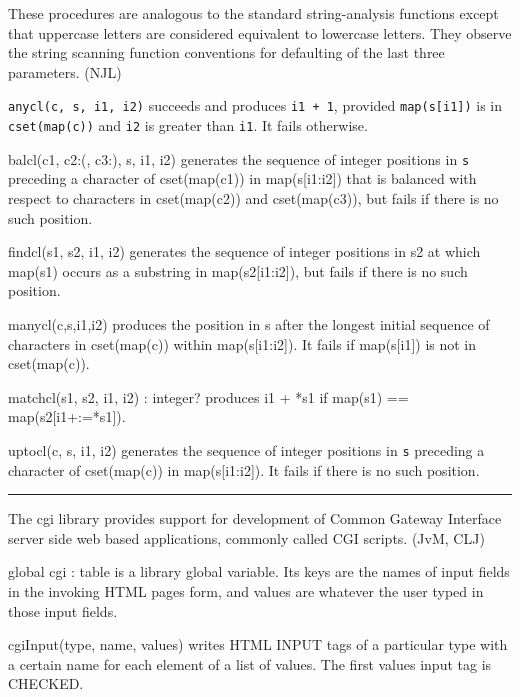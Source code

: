 These procedures are analogous to the standard string-analysis functions
except that uppercase letters are considered equivalent to lowercase
letters. They observe the string scanning function conventions for
defaulting of the last three parameters. (NJL)

\texttt{anycl(c, s, i1, i2)} succeeds and produces \texttt{i1 + 1},
provided \texttt{map(s[i1])} is in \texttt{cset(map(c))} and
\texttt{i2} is greater than \texttt{i1}. It fails otherwise.

\textsf{balcl(c1, c2:{\textquotesingle}({\textquotesingle},
c3:{\textquotesingle}){\textquotesingle}, s, i1, i2)} generates the
sequence of integer positions in \texttt{s} preceding a character of
\textsf{cset(map(c1))} in \textsf{map(s[i1:i2])} that is balanced with
respect to characters in \textsf{cset(map(c2))} and
\textsf{cset(map(c3))}, but fails if there is no such position.

\textsf{findcl(s1, s2, i1, i2)} generates the sequence of integer
positions in \textsf{s2} at which \textsf{map(s1)} occurs as a
substring in \textsf{map(s2[i1:i2])}, but fails if there is no such
position.

\textsf{manycl(c,s,i1,i2)} produces the position in \textsf{s} after the
longest initial sequence of characters in \textsf{cset(map(c))} within
\textsf{map(s[i1:i2])}. It fails if \textsf{map(s[i1])} is not in
\textsf{cset(map(c))}.

\textsf{matchcl(s1, s2, i1, i2) : integer?} produces i1 + *s1 if map(s1)
== map(s2[i1+:=*s1]).

\textsf{uptocl(c, s, i1, i2)} generates the sequence of integer
positions in \texttt{s} preceding a character of \textsf{cset(map(c))}
in \textsf{map(s[i1:i2])}. It fails if there is no such position.

\vspace{0.25cm}\hrule{}

The cgi library provides support for development of Common Gateway
Interface server side web based applications, commonly called
CGI scripts. (JvM, CLJ)

\textsf{global cgi : table} is a library global variable. Its keys are
the names of input fields in the invoking HTML page{\textquotesingle}s
form, and values are whatever the user typed in those input fields. 

\textsf{cgiInput(type, name, values)} writes HTML INPUT tags
of a particular type with a certain name for each element of a list of
values. The first value{\textquotesingle}s input tag is CHECKED. 

